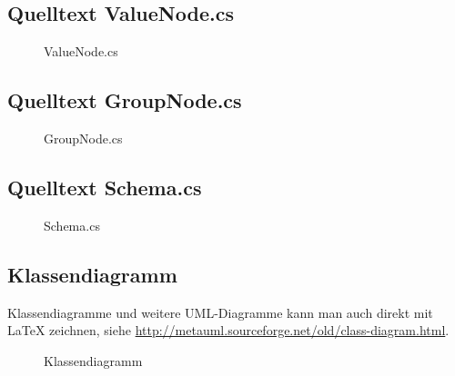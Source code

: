 \subsection{Quelltext ValueNode.cs}
\label{app:ValueNodeSrc}
\begin{figure}[htb]
\centering
{}
\caption{ValueNode.cs}
\end{figure}
\clearpage

\subsection{Quelltext GroupNode.cs}
\label{app:GroupNodeSrc}
\begin{figure}[htb]
\centering
{}
\caption{GroupNode.cs}
\end{figure}
\clearpage


\subsection{Quelltext Schema.cs}
\label{app:SchemaSrc}
\begin{figure}[htb]
\centering
{}
\caption{Schema.cs}
\end{figure}
\clearpage


\subsection{Klassendiagramm}
\label{app:Klassendiagramm}
Klassendiagramme und weitere \acs{UML}-Diagramme kann man auch direkt mit \LaTeX{} zeichnen, siehe \zB \url{http://metauml.sourceforge.net/old/class-diagram.html}.
\begin{figure}[htb]
\centering
{}
\caption{Klassendiagramm}
\end{figure}
\clearpage


